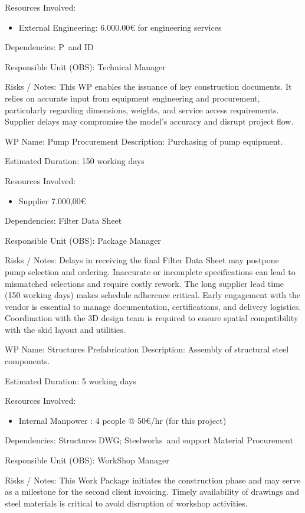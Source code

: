 Resources Involved:
\begin{itemize}
    \item External Engineering: 6,000.00€ for engineering services
\end{itemize}

Dependencies:
P\ and ID

Responsible Unit (OBS): Technical Manager

Risks / Notes:
This WP enables the issuance of key construction documents. It relies on accurate input from equipment engineering and procurement, particularly regarding dimensions, weights, and service access requirements. Supplier delays may compromise the model’s accuracy and disrupt project flow.

WP Name: Pump Procurement
Description:
Purchasing of pump equipment.

Estimated Duration: 150 working days

Resources Involved:
\begin{itemize}
    \item  Supplier 7.000,00€
\end{itemize}

Dependencies:
Filter Data Sheet

Responsible Unit (OBS): Package Manager

Risks / Notes:
Delays in receiving the final Filter Data Sheet may postpone pump selection and ordering.
Inaccurate or incomplete specifications can lead to mismatched selections and require costly rework.
The long supplier lead time (150 working days) makes schedule adherence critical.
Early engagement with the vendor is essential to manage documentation, certifications, and delivery logistics.
Coordination with the 3D design team is required to ensure spatial compatibility with the skid layout and utilities.

WP Name: Structures Prefabrication
Description:
Assembly of structural steel components.

Estimated Duration: 5 working days

Resources Involved:
\begin{itemize}
    \item  Internal Manpower : 4 people @ 50€/hr (for this project)
\end{itemize}

Dependencies:
Structures DWG; Steelworks\ and support Material Procurement

Responsible Unit (OBS): WorkShop Manager

Risks / Notes:
This Work Package initiates the construction phase and may serve as a milestone for the second client invoicing. Timely availability of drawings and steel materials is critical to avoid disruption of workshop activities.

